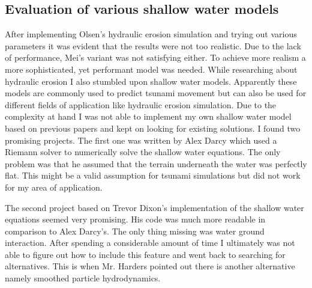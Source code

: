 \documentclass[11pt,a4paper,twoside,openright]{report}
\begin{document}
\subsection{Evaluation of various shallow water models}
After implementing Olsen's hydraulic erosion simulation and trying out various parameters it was evident that the results were not too realistic. Due to the lack of performance, Mei's variant was not satisfying either. To achieve more realism a more sophisticated, yet performant model was needed. While researching about hydraulic erosion I also stumbled upon shallow water models. Apparently these models are commonly used to predict tsunami movement but can also be used for different fields of application like hydraulic erosion simulation. Due to the complexity at hand I was not able to implement my own shallow water model based on previous papers and kept on looking for existing solutions. I found two promising projects. The first one was written by Alex Darcy which used a Riemann solver to numerically solve the shallow water equations. The only problem was that he assumed that the terrain underneath the water was perfectly flat. This might be a valid assumption for tsunami simulations but did not work for my area of application.

The second project based on Trevor Dixon's implementation of the shallow water equations seemed very promising. His code was much more readable in comparison to Alex Darcy's. The only thing missing was water ground interaction. After spending a considerable amount of time I ultimately was not able to figure out how to include this feature and went back to searching for alternatives. This is when Mr. Harders pointed out there is another alternative namely smoothed particle hydrodynamics.
\end{document}
